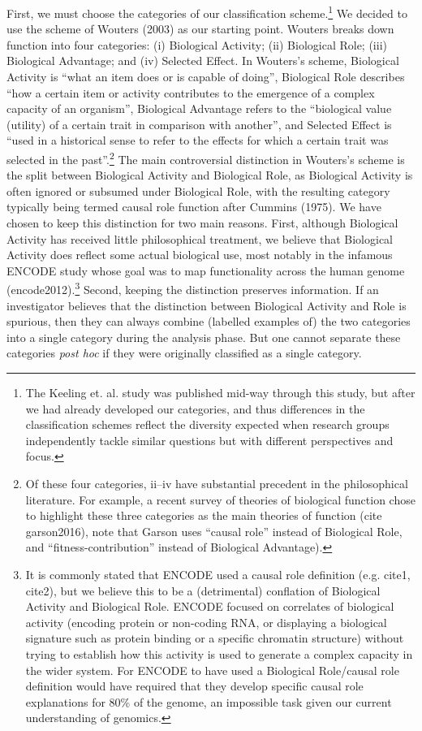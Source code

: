 \documentclass{article}
\begin{document}
First, we must choose the categories of our classification scheme.\footnote{The Keeling et. al. study was published mid-way through this study, but after we had already developed our categories, and thus differences in the classification schemes reflect the diversity expected when research groups independently tackle similar questions but with different perspectives and focus.}
We decided to use the scheme of Wouters (2003) as our starting point.
Wouters breaks down function into four categories: (i) Biological Activity; (ii) Biological Role; (iii) Biological Advantage; and (iv) Selected Effect.
In Wouters's scheme, Biological Activity is ``what an item does or is capable of doing'', Biological Role describes ``how a certain item or activity contributes to the emergence of a complex capacity of an organism'', Biological Advantage refers to the ``biological value (utility) of a certain trait in comparison with another'', and Selected Effect is ``used in a historical sense to refer to the effects for which a certain trait was selected in the past''.\footnote{Of these four categories, ii--iv have substantial precedent in the philosophical literature. For example, a recent survey of theories of biological function chose to highlight these three categories as the main theories of function (cite garson2016), note that Garson uses ``causal role'' instead of Biological Role, and ``fitness-contribution'' instead of Biological Advantage).}
The main controversial distinction in Wouters's scheme is the split between Biological Activity and Biological Role, as Biological Activity is often ignored or subsumed under Biological Role, with the resulting category typically being termed causal role function after Cummins (1975).
We have chosen to keep this distinction for two main reasons.
First, although Biological Activity has received little philosophical treatment, we believe that Biological Activity does reflect some actual biological use, most notably in the infamous ENCODE study whose goal was to map functionality across the human genome (encode2012).\footnote{It is commonly stated that ENCODE used a causal role definition (e.g. cite1, cite2), but we believe this to be a (detrimental) conflation of Biological Activity and Biological Role. ENCODE focused on correlates of biological activity (encoding protein or non-coding RNA, or displaying a biological signature such as protein binding or a specific chromatin structure) without trying to establish how this activity is used to generate a complex capacity in the wider system. For ENCODE to have used a Biological Role/causal role definition would have required that they develop specific causal role explanations for 80\% of the genome, an impossible task given our current understanding of genomics.}
Second, keeping the distinction preserves information.
If an investigator believes that the distinction between Biological Activity and Role is spurious, then they can always combine (labelled examples of) the two categories into a single category during the analysis phase.
But one cannot separate these categories \emph{post hoc} if they were originally classified as a single category.
\end{document}
